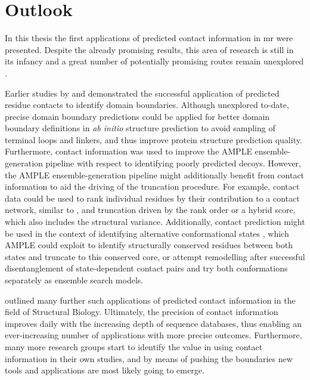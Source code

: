 \section{Outlook}
In this thesis the first applications of predicted contact information in \gls{mr} were presented. Despite the already promising results, this area of research is still in its infancy and a great number of potentially promising routes remain unexplored \cite{Simkovic2017-xs}. 

Earlier studies by \textcite{Rigden2002-mf} and \textcite{Sadowski2013-zu} demonstrated the successful application of predicted residue contacts to identify domain boundaries. Although unexplored to-date, precise domain boundary predictions could be applied for better domain boundary definitions in \textit{ab initio} structure prediction to avoid sampling of terminal loops and linkers, and thus improve protein structure prediction quality. Furthermore, contact information was used to improve the AMPLE ensemble-generation pipeline with respect to identifying poorly predicted decoys. However, the AMPLE ensemble-generation pipeline might additionally benefit from contact information to aid the driving of the truncation procedure. For example, contact data could be used to rank individual residues by their contribution to a contact network, similar to \cite{Parente2015-mv}, and truncation driven by the rank order or a hybrid score, which also includes the structural variance. Additionally, contact prediction might be used in the context of identifying alternative conformational states \cite{Hopf2012-zl,Jana2014-rw,Sfriso2016-ml,Morcos2013-ks, Sutto2015-ck}, which AMPLE could exploit to identify structurally conserved residues between both states and truncate to this conserved core, or attempt remodelling after successful disentanglement of state-dependent contact pairs and try both conformations separately as ensemble search models. 

\textcite{Simkovic2017-xs} outlined many further such applications of predicted contact information in the field of Structural Biology. Ultimately, the precision of contact information improves daily with the increasing depth of sequence databases, thus enabling an ever-increasing number of applications with more precise outcomes. Furthermore, many more research groups start to identify the value in using contact information in their own studies, and by means of pushing the boundaries new tools and applications are most likely going to emerge. 


